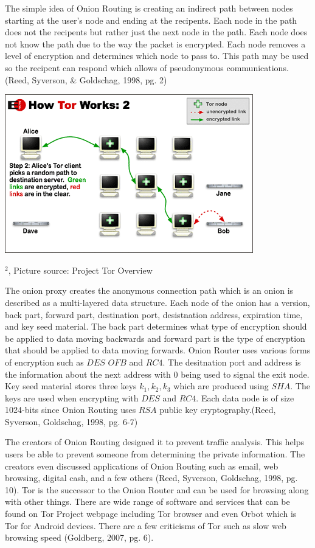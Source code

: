 \documentclass[12pt]{article}
\def\inst#1{$^{#1}$}
\begin{document}
The simple idea of Onion Routing is creating an indirect path between nodes starting at the user's node and ending at the recipents. Each node in the path does not the recipents but rather just the next node in the path. Each node does not know the path due to the way the packet is encrypted. Each node removes a level of encryption and determines which node to pass to. This path may be used so the recipent can respond which allows of pseudonymous communications. (Reed, Syverson, \& Goldschag, 1998, pg. 2)

\includegraphics{tor-path}
\begin{center}
{\footnotesize
\inst{2}, Picture source: Project Tor Overview}
\end{center}

The onion proxy creates the anonymous connection path which is an onion is described as a multi-layered data structure. Each node of the onion has a version, back part, forward part, destination port, desistnation address, expiration time, and key seed material. The back part determines what type of encryption should be applied to data moving backwards and forward part is the type of encryption that should be applied to data moving forwards.  Onion Router uses various forms of encryption such as $DES$ $OFB$ and $RC4$. The desitnation port and address is the information about the next address with 0 being used to signal the exit node. Key seed material stores three keys $k_1, k_2, k_3$ which are produced using $SHA$. The keys are used when encrypting with $DES$ and $RC4$. Each data node is of size 1024-bits since Onion Routing uses $RSA$ public key cryptography.(Reed, Syverson, Goldschag, 1998, pg. 6-7)

The creators of Onion Routing designed it to prevent traffic analysis. This helps users be able to prevent someone from determining the private information. The creators even discussed applications of Onion Routing such as email, web browsing, digital cash, and a few others (Reed, Syverson, Goldschag, 1998, pg. 10). Tor is the successor to the Onion Router and can be used for browsing along with other things. There are wide range of software and services that can be found on Tor Project webpage including Tor browser and even Orbot which is Tor for Android devices. There are a few criticisms of Tor such as slow web browsing speed (Goldberg, 2007, pg. 6).
\end{document}

